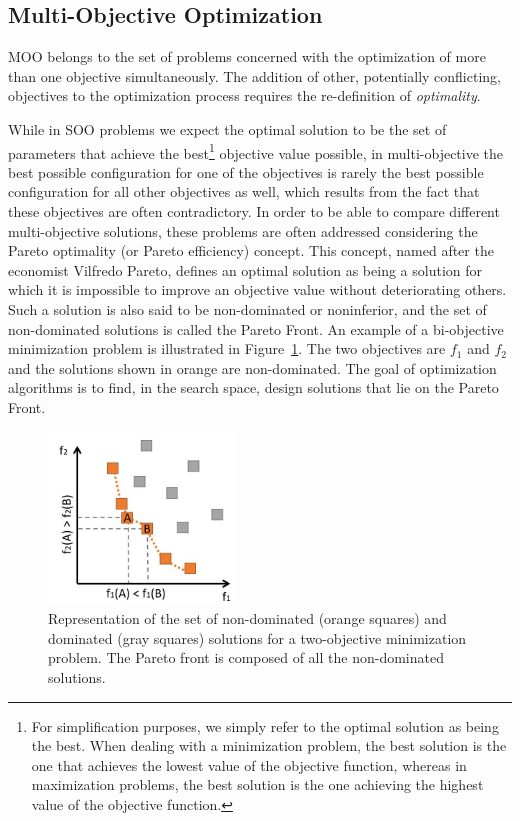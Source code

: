 	\subsection{Multi-Objective Optimization}
	\ac{MOO} belongs to the set of problems concerned with the optimization of more than one objective simultaneously. The addition of other, potentially conflicting, objectives to the optimization process requires the re-definition of \textit{optimality}. 
	
	While in \ac{SOO} problems we expect the optimal solution to be the set of parameters that achieve the best\footnote{For simplification purposes, we simply refer to the optimal solution as being the best. When dealing with a minimization problem, the best solution is the one that achieves the lowest value of the objective function, whereas in maximization problems, the best solution is the one achieving the highest value of the objective function.} objective value possible, in multi-objective the best possible configuration for one of the objectives is rarely the best possible configuration for all other objectives as well, which results from the fact that these objectives are often contradictory. In order to be able to compare different multi-objective solutions, these problems are often addressed considering the Pareto optimality (or Pareto efficiency) concept. This concept, named after the economist Vilfredo Pareto, defines an optimal solution as being a solution for which it is impossible to improve an objective value without deteriorating others. Such a solution is also said to be non-dominated or noninferior, and the set of non-dominated solutions is called the Pareto Front. An example of a bi-objective minimization problem is illustrated in Figure~\ref{fig:paretofrontier}. The two objectives are $f_1$ and $f_2$ and the solutions shown in orange are non-dominated. The goal of optimization algorithms is to find, in the search space, design solutions that lie on the Pareto Front.
	
	\begin{figure}
		\centering
		\includegraphics[width=5cm]{Images/Background/pareto-front.JPG}
		\caption[Example of a bi-objective optimization problem]{Representation of the set of non-dominated (orange squares) and dominated (gray squares) solutions for a two-objective minimization problem. The Pareto front is composed of all the non-dominated solutions.}
		\label{fig:paretofrontier}
	\end{figure}
	
